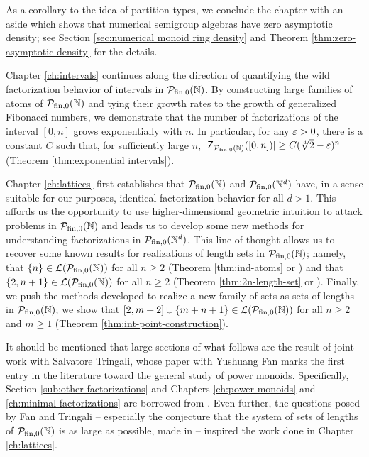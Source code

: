 As a corollary to the idea of partition types, we conclude the chapter with an aside which shows that numerical semigroup algebras have zero asymptotic density; see Section \ref{sec:numerical monoid ring density} and Theorem \ref{thm:zero-asymptotic density} for the details.

Chapter \ref{ch:intervals} continues along the direction of quantifying the wild factorization behavior of intervals in ${\mathcal{P}_{\textrm{fin},0}(\mathbb{N})}$.
By constructing large families of atoms of ${\mathcal{P}_{\textrm{fin},0}(\mathbb{N})}$ and tying their growth rates to the growth of generalized Fibonacci numbers, we demonstrate that the number of factorizations of the interval $[0,n]$ grows exponentially with $n$.
In particular, for any $\varepsilon>0$, there is a constant $C$ such that, for sufficiently large $n$, $|\mathsf{Z}_{\mathcal{P}_{\textrm{fin},0}(\mathbb{N})}([0,n])| \ge C(\sqrt[4]{2}-\varepsilon)^n$ (Theorem \ref{thm:exponential intervals}).

Chapter \ref{ch:lattices} first establishes that ${\mathcal{P}_{\textrm{fin},0}(\mathbb{N})}$ and $\mathcal{P}_{\textrm{fin}, 0}(\mathbb{N}^d)$ have, in a sense suitable for our purposes, identical factorization behavior for all $d>1$.
This affords us the opportunity to use higher-dimensional geometric intuition to attack problems in ${\mathcal{P}_{\textrm{fin},0}(\mathbb{N})}$ and leads us to develop some new methods for understanding factorizations in $\mathcal{P}_{\textrm{fin}, 0}(\mathbb{N}^d)$.
This line of thought allows us to recover some known results for realizations of length sets in ${\mathcal{P}_{\textrm{fin},0}(\mathbb{N})}$; namely, that $\{n\} \in\mathcal{L}({\mathcal{P}_{\textrm{fin},0}(\mathbb{N})})$ for all $n\ge 2$ (Theorem \ref{thm:ind-atoms} or  \cite[Proposition 4.9]{fan-tringali18}) and that $\{2,n+1\}\in \mathcal{L}({\mathcal{P}_{\textrm{fin},0}(\mathbb{N})})$ for all $n\ge 2$ (Theorem \ref{thm:2n-length-set} or \cite[Proposition 4.10]{fan-tringali18}).
Finally, we push the methods developed to realize a new family of sets as sets of lengths in ${\mathcal{P}_{\textrm{fin},0}(\mathbb{N})}$; we show that $[2,m+2]\cup\{m+n+1\}\in \mathcal{L}({\mathcal{P}_{\textrm{fin},0}(\mathbb{N})})$ for all $n\ge 2$ and $m\ge 1$ (Theorem \ref{thm:int-point-construction}).

It should be mentioned that large sections of what follows are the result of joint work with Salvatore Tringali, whose paper \cite{fan-tringali18} with Yushuang Fan marks the first entry in the literature toward the general study of power monoids.
Specifically, Section \ref{sub:other-factorizations} and Chapters \ref{ch:power monoids} and \ref{ch:minimal factorizations} are borrowed from \cite{antoniou-tringali19}.  
Even further, the questions posed by Fan and Tringali -- especially the conjecture that the system of sets of lengths of ${\mathcal{P}_{\textrm{fin},0}(\mathbb{N})}$ is as large as possible, made in \cite[Section 5]{fan-tringali18} -- inspired the work done in Chapter \ref{ch:lattices}.



